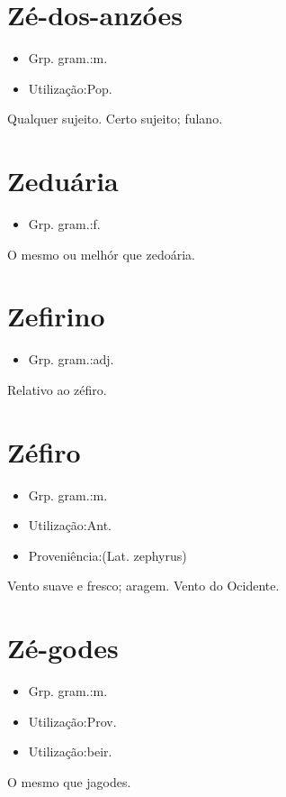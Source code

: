 \section{Zé-dos-anzóes}
\begin{itemize}
\item {Grp. gram.:m.}
\end{itemize}
\begin{itemize}
\item {Utilização:Pop.}
\end{itemize}
Qualquer sujeito.
Certo sujeito; fulano.
\section{Zeduária}
\begin{itemize}
\item {Grp. gram.:f.}
\end{itemize}
O mesmo ou melhór que \textunderscore zedoária\textunderscore .
\section{Zefirino}
\begin{itemize}
\item {Grp. gram.:adj.}
\end{itemize}
Relativo ao zéfiro.
\section{Zéfiro}
\begin{itemize}
\item {Grp. gram.:m.}
\end{itemize}
\begin{itemize}
\item {Utilização:Ant.}
\end{itemize}
\begin{itemize}
\item {Proveniência:(Lat. \textunderscore zephyrus\textunderscore )}
\end{itemize}
Vento suave e fresco; aragem.
Vento do Ocidente.
\section{Zé-godes}
\begin{itemize}
\item {Grp. gram.:m.}
\end{itemize}
\begin{itemize}
\item {Utilização:Prov.}
\end{itemize}
\begin{itemize}
\item {Utilização:beir.}
\end{itemize}
O mesmo que \textunderscore jagodes\textunderscore .

